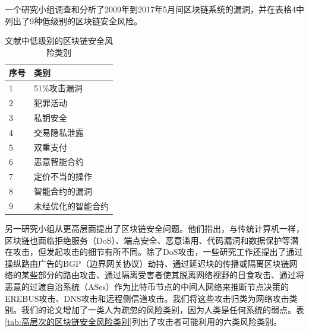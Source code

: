 \begin{translation}
一个研究小组调查和分析了2009年到2017年5月间区块链系统的漏洞，并在表格4\cite{art29}中列出了9种低级别的区块链安全风险。

\begin{table}[h] 
    \centering 
    \caption{文献\cite{art29}中低级别的区块链安全风险类别} \label{tab:文献中低级别的区块链安全风险类别} 
    \begin{tabular}{|p{1.5cm}|p{5cm}|} 
    \hline 序号 & 类别 \\
    \hline 1 & 51\%攻击漏洞 \\
    \hline 2 & 犯罪活动 \\
    \hline 3 & 私钥安全 \\
    \hline 4 & 交易隐私泄露 \\
    \hline 5 & 双重支付 \\
    \hline 6 & 恶意智能合约 \\
    \hline 7 & 定价不当的操作 \\
    \hline 8 & 智能合约的漏洞 \\
    \hline 9 & 未经优化的智能合约 \\
    \hline 
    \end{tabular} 
\end{table}

另一研究小组从更高层面提出了区块链安全问题。他们指出，与传统计算机一样，区块链也面临拒绝服务（DoS）、端点安全、恶意滥用、代码漏洞和数据保护等潜在攻击，但发起攻击的细节有所不同\cite{art41}。除了DoS攻击，一些研究工作还提出了通过操纵路由广告的BGP（边界网关协议）劫持、通过延迟块的传播或隔离区块链网络的某些部分的路由攻击、通过隔离受害者使其脱离网络视野的日食攻击、通过将恶意的过渡自治系统（ASes）作为比特币节点的中间人网络来推断节点决策的EREBUS攻击、DNS攻击和远程侧信道攻击。我们将这些攻击归类为网络攻击类别。我们的论文增加了一类人为疏忽的风险类别，因为人类是任何系统的弱点。表\ref{tab:高层次的区块链安全风险类别}列出了攻击者可能利用的六类风险类别。


\end{translation}
